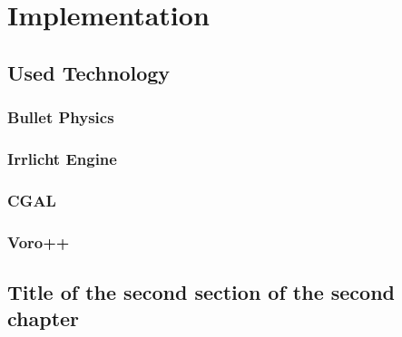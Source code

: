 \chapter{Implementation}

\section{Used Technology}
\subsection{Bullet Physics}
\subsection{Irrlicht Engine}
\subsection{CGAL}
\subsection{Voro++}


\section{Title of the second section of the second chapter}
